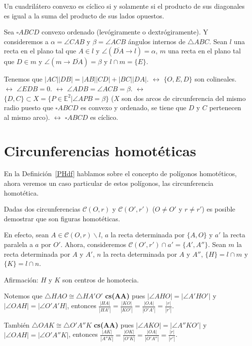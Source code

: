 \begin{teo}
Un cuadrilátero convexo es cíclico si y solamente si el producto de sus diagonales es igual a la suma del producto de sus lados opuestos. 
\end{teo}
\begin{dem}
Sea $\square ABCD$ convexo ordenado (levógiramente o dextrógiramente). Y consideremos a $\alpha=\angle CAB$ y $\beta=\angle ACB$ ángulos internos de $\triangle ABC$.
Sean $l$ una recta en el plano tal que $A\in l$ y $\angle (\overline{DA}\longrightarrow l)=\alpha$, $m$ una recta en el plano tal que $D\in m$ y $\angle(m\longrightarrow\overline{DA})=\beta$ y $l\cap m=\{E\}$.

Tenemos que $|AC||DB|=|AB||CD|+|BC||DA|$.
$\leftrightarrow$ $\{O,E,D\}$ son colineales.
$\leftrightarrow$ $\angle EDB=0$.
$\leftrightarrow$ $\angle ADB=\angle ACB=\beta$.
$\leftrightarrow$ $\{D,C\}\subset X=\{P\in\mathbb{E}^{2}|\angle APB=\beta\}$
($X$ son dos arcos de circunferencia del mismo radio puesto que $\square ABCD$ es convexo y ordenado, se tiene que $D$ y $C$ pertenecen al mismo arco).
$\leftrightarrow$ $\square ABCD$ es cíclico. 
\end{dem}


\section{Circunferencias homotéticas}
En la Definición~\ref{PHdf} hablamos sobre el concepto de polígonos homotéticos, ahora veremos un caso particular de estos polígonos, las circunferencia homotética. 

Dadas dos circunferencias $\mathcal{C}(O,r)$ y $\mathcal{C}(O',r')$ ($O\neq O'$ y $r\neq r'$) es posible demostrar que son figuras homotéticas. 

En efecto, sean $A\in\mathcal{C}(O,r)\backslash l$, $a$ la recta determinada por $\{A,O\}$
y $a'$ la recta paralela a $a$ por $O'$.
Ahora, consideremos $\mathcal{C}(O',r')\cap a'=\{A',A''\}$. Sean $m$ la recta determinada por $A$ y $A'$, $n$ la recta determinada por $A$ y $A''$, $\{H\}=l\cap m$ y $\{K\}=l\cap n$.

Afirmación: $H$ y $K$ son centros de homotecia.

Notemos que $\triangle HAO\cong\triangle HA'O'$ \textbf{cs(AA)} pues $|\angle AHO|=|\angle A'HO'|$ y $|\angle OAH|=|\angle O'A'H|$, entonces $\frac{|HA|}{|HA'|}=\frac{|KO|}{|KO'|}=\frac{|OA|}{|O'A'|}=\frac{|r|}{|r'|}$.

También $\triangle OAK\cong\triangle O'A''K$ \textbf{cs(AA)} pues $|\angle AKO|=|\angle A''KO'|$ y $|\angle OAH|=|\angle O'A''K|$, entonces $\frac{|AK|}{|A''K|}=\frac{|OK|}{|O'K|}=\frac{|OA|}{|O'A''|}=\frac{|r|}{|r'|}$.

